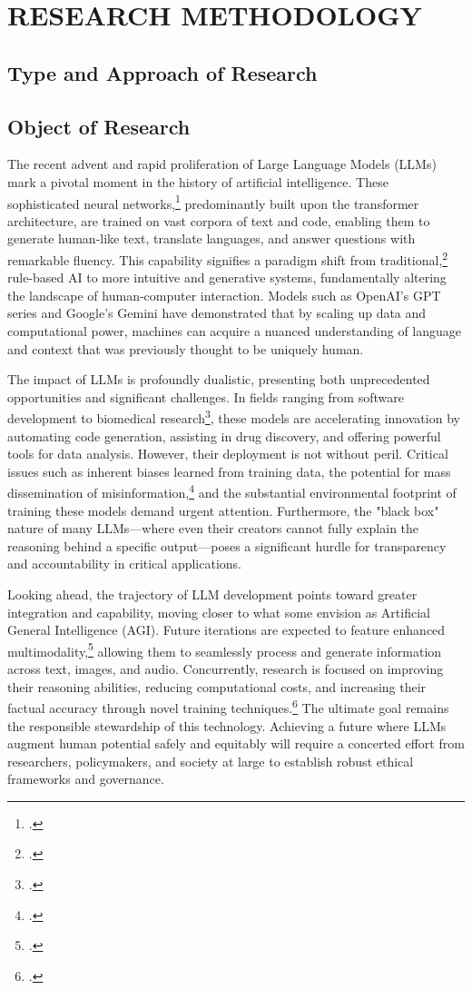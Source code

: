 \chapter{RESEARCH METHODOLOGY}
	\section{Type and Approach of Research}
	\setlength{\leftskip}{0.7cm}
	\lipsum[3]		
	\section{Object of Research}
	The recent advent and rapid proliferation of Large Language Models (LLMs) mark a pivotal moment in the history of artificial intelligence. These sophisticated neural networks,\footcite{alip2022} predominantly built upon the transformer architecture, are trained on vast corpora of text and code, enabling them to generate human-like text, translate languages, and answer questions with remarkable fluency. This capability signifies a paradigm shift from traditional,\footcite{azizah2024} rule-based AI to more intuitive and generative systems, fundamentally altering the landscape of human-computer interaction. Models such as OpenAI's GPT series and Google's Gemini have demonstrated that by scaling up data and computational power, machines can acquire a nuanced understanding of language and context that was previously thought to be uniquely human.
	
	The impact of LLMs is profoundly dualistic, presenting both unprecedented opportunities and significant challenges. In fields ranging from software development to biomedical research\footcite{alnajjar2007}, these models are accelerating innovation by automating code generation, assisting in drug discovery, and offering powerful tools for data analysis. However, their deployment is not without peril. Critical issues such as inherent biases learned from training data, the potential for mass dissemination of misinformation,\footcite{alip2022} and the substantial environmental footprint of training these models demand urgent attention. Furthermore, the "black box" nature of many LLMs—where even their creators cannot fully explain the reasoning behind a specific output—poses a significant hurdle for transparency and accountability in critical applications.
	
	Looking ahead, the trajectory of LLM development points toward greater integration and capability, moving closer to what some envision as Artificial General Intelligence (AGI). Future iterations are expected to feature enhanced multimodality,\footcite{akbar2024} allowing them to seamlessly process and generate information across text, images, and audio. Concurrently, research is focused on improving their reasoning abilities, reducing computational costs, and increasing their factual accuracy through novel training techniques.\footcite{alhusain2016} The ultimate goal remains the responsible stewardship of this technology. Achieving a future where LLMs augment human potential safely and equitably will require a concerted effort from researchers, policymakers, and society at large to establish robust ethical frameworks and governance.
